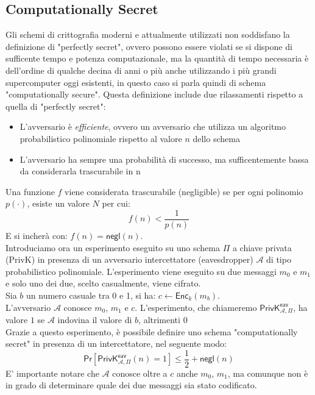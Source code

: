 \subsection{Computationally Secret}
Gli schemi di crittografia moderni e attualmente utilizzati non soddisfano la definizione di "perfectly secret", ovvero possono essere violati se si dispone di sufficente tempo e potenza computazionale, ma la quantità di tempo necessaria è dell'ordine di qualche decina di anni o più anche utilizzando i più grandi supercomputer oggi esistenti, in questo caso si parla quindi di schema "computationally secure".
Questa definizione include due rilassamenti rispetto a quella di "perfectly secret":
\begin{itemize}
    \item{L'avversario è \emph{efficiente}, ovvero un avversario che utilizza un algoritmo probabilistico polinomiale rispetto al valore $n$ dello schema}
    \item{L'avversario ha sempre una probabilità di successo, ma sufficentemente bassa da considerarla trascurabile in n}
\end{itemize}
Una funzione $f$ viene considerata trascurabile (negligible) se per ogni polinomio $p(\cdot)$, esiste un valore $N$ per cui:
$$
    f(n) < \frac{1}{p(n)}
$$
E si incherà con: $f(n) = \mathsf{negl}(n)$. \\
Introduciamo ora un esperimento eseguito su uno schema $\Pi$ a chiave privata (PrivK) in presenza di un avversario intercettatore (eavesdropper) $\mathcal{A}$ di tipo probabilistico polinomiale. L'esperimento viene eseguito su due messaggi $m_0$ e $m_1$ e solo uno dei due, scelto casualmente, viene cifrato. \\
Sia $b$ un numero casuale tra 0 e 1, si ha: $c \leftarrow \mathsf{Enc}_k(m_b)$.\\
L'avversario $\mathcal{A}$ conosce $m_0$, $m_1$ e $c$.
L'esperimento, che chiameremo $\mathsf{PrivK}^{\mathsf{eav}}_{\mathcal{A}, \Pi}$, ha valore $1$ se $\mathcal{A}$ indovina il valore di $b$, altrimenti $0$ \\
Grazie a questo esperimento, è possibile definire uno schema "computationally secret" in presenza di un intercettatore, nel seguente modo:
$$
   \mathsf{Pr}[\mathsf{PrivK}^{\mathsf{eav}}_{\mathcal{A}, \Pi}(n) = 1] \leq \frac{1}{2} + \mathsf{negl}(n)
$$
E' importante notare che $\mathcal{A}$ conosce oltre a $c$ anche $m_0$, $m_1$, ma comunque non è in grado di determinare quale dei due messaggi sia stato codificato.
